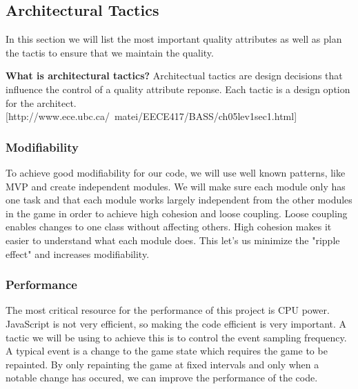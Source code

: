\subsection{Architectural Tactics}
In this section we will list the most important quality attributes as well as plan the tactis to 
ensure that we maintain the quality.

{\bf What is architectural tactics? }
Architectual tactics are design decisions that influence the control of a quality attribute reponse. 
Each tactic is a design option for the architect. [http://www.ece.ubc.ca/~matei/EECE417/BASS/ch05lev1sec1.html]

\subsubsection{Modifiability}
To achieve good modifiability for our code, we will use well known patterns, like MVP and create 
independent modules. We will make sure each module only has one task and that each module works 
largely independent from the other modules in the game in order to achieve high cohesion and loose 
coupling. Loose coupling enables changes to one class without affecting others. High cohesion makes 
it easier to understand what each module does. This let's us minimize the "ripple effect" and 
increases modifiability.

\subsubsection{Performance}
The most critical resource for the performance of this project is CPU power. JavaScript is not very 
efficient, so making the code efficient is very important. A tactic we will be using to achieve this 
is to control the event sampling frequency. A typical event is a change to the game state which 
requires the game to be repainted. By only repainting the game at fixed intervals and only when a 
notable change has occured, we can improve the performance of the code.